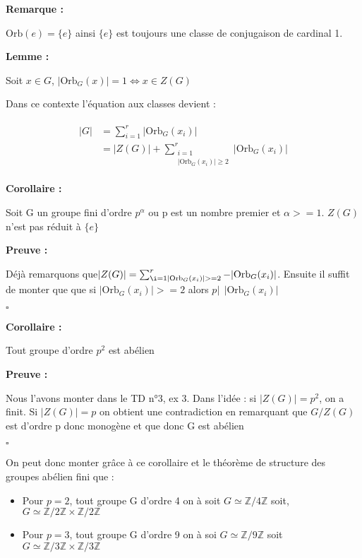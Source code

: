 \documentclass{report}
\renewenvironment{leftbar}{%
  \def\FrameCommand{\vrule width 0.4pt \hspace{10pt}}%
  \MakeFramed {\advance\hsize-\width \FrameRestore}}%
 {\endMakeFramed}%
\newenvironment{preuve}{\vspace*{0.5cm}
    \begin{leftbar}
    \noindent\textbf{Preuve :}\par}{
    \begin{flushright}
    $\square$
    \end{flushright}
    \end{leftbar}
}
\newenvironment{corollaire}{\begin{tcolorbox}[colframe= white]
    \textbf{Corollaire :} \par}
    {\end{tcolorbox}}
\newenvironment{lemme}[2][white]{\begin{tcolorbox}[colframe= #1]
    \textbf{Lemme :} #2  \par}
    {\end{tcolorbox}}
\newcommand{\remarque}{
    \noindent\textbf{Remarque :} \par
}
\newcommand{\Z}{\mathbb{Z}}
\newcommand{\orb}{\text{Orb}}
\begin{document}
\remarque{$\orb(e) = \{ e\}$} ainsi $\{e\}$ est toujours une classe de conjugaison de cardinal 1.

\begin{lemme}\par
Soit $x\in G$, $|\orb_{G}(x)|=1 \Longleftrightarrow x\in Z(G)$
\end{lemme}

Dans ce contexte l'équation aux classes devient :
\begin{center}
\begin{align*}
\begin{split}
|G| &= \sum_{i=1}^{r} |\orb_{G}(x_{i})| \\
    &= |Z(G)| + \sum_{\substack{i=1 \\ |\orb_G(x_i)| \geq 2}
}^{r} |\orb_{G}(x_{i})|
\end{split}
\end{align*}
\end{center}%


\begin{corollaire}
Soit G un groupe fini d'ordre $p^{\alpha}$ ou p est un nombre premier et $\alpha >= 1$. $Z(G)$ n'est pas réduit à $\{e\}$
\end{corollaire}

\begin{preuve}
 Déjà remarquons que$|Z(G)| = \sum_{\i=1  |\orb_{G}(x_{i})|>= 2}^{r} - |\orb_{G}(x_{i})|$. Ensuite il suffit de monter que que  si $|\orb_{G}(x_{i})|>= 2$ alors $p|~~|\orb_{G}(x_{i})|$
\end{preuve}

\begin{corollaire}
Tout groupe d'ordre $p^{2}$ est abélien
\end{corollaire}

\begin{preuve}
Nous l'avons monter dans le TD n°3, ex 3.
Dans l'idée : si $|Z(G)|=p^{2}$, on a finit. Si $|Z(G)|=p$ on obtient une contradiction en remarquant que $G/Z(G)$ est d'ordre p donc monogène et que donc G est abélien
\end{preuve}
On peut donc monter grâce à ce corollaire et le théorème de structure des groupes abélien fini que :
\begin{itemize}
\item Pour $p=2$, tout groupe G d'ordre 4 on à soit $G\simeq \Z/4\Z$ soit, $G \simeq \Z/2\Z \times \Z/2\Z$
\item Pour $p=3$, tout groupe G d'ordre 9 on à soi $G\simeq \Z/9\Z$ soit $G \simeq \Z/3\Z \times \Z/3\Z$
\end{itemize}
\end{document}
